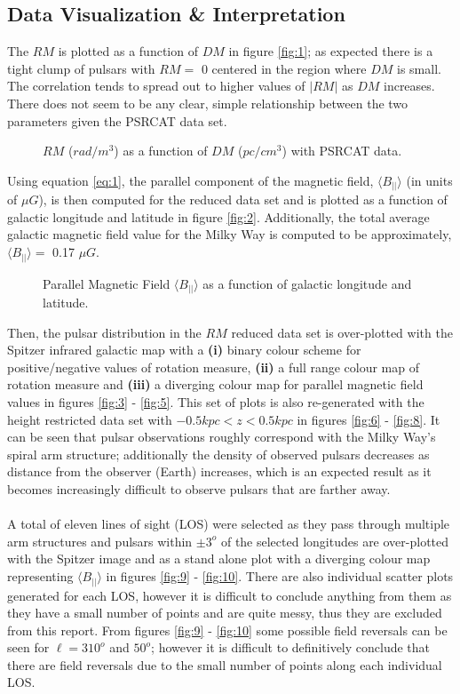 \documentclass[12pt]{article}
\begin{document}
\subsection{Data Visualization \& Interpretation}
    The $RM$ is plotted as a function of $DM$ in figure \eqref{fig:1}; as expected there is a tight clump of pulsars with $RM =$ 0 centered in the region where $DM$ is small. The correlation tends to spread out to higher values of $|RM|$ as $DM$ increases. There does not seem to be any clear, simple relationship between the two parameters given the PSRCAT data set.
    \begin{figure}[!htb]
        \caption{\label{fig:1} $RM$ ($rad/m^{3}$) as a function of $DM$ ($pc/cm^{3}$) with PSRCAT data.}
    \end{figure}
    Using equation \eqref{eq:1}, the parallel component of the magnetic field, $\langle B_{||} \rangle$ (in units of $\mu G$), is then computed for the reduced data set and is plotted as a function of galactic longitude and latitude in figure \eqref{fig:2}. Additionally, the total average galactic magnetic field value for the Milky Way is computed to be approximately, $\langle B_{||} \rangle =$ 0.17 $\mu G$.
    \begin{figure}[!htb]
        \caption{\label{fig:2} Parallel Magnetic Field $\langle B_{||} \rangle$ as a function of galactic longitude and latitude.}
    \end{figure}
    Then, the pulsar distribution in the $RM$ reduced data set is over-plotted with the Spitzer infrared galactic map with a \textbf{(i)} binary colour scheme for positive/negative values of rotation measure, \textbf{(ii)} a full range colour map of rotation measure and \textbf{(iii)} a diverging colour map for parallel magnetic field values in figures \eqref{fig:3} - \eqref{fig:5}. This set of plots is also re-generated with the height restricted data set with $-0.5 kpc < z < 0.5 kpc$ in figures \eqref{fig:6} - \eqref{fig:8}. It can be seen that pulsar observations roughly correspond with the Milky Way's spiral arm structure; additionally the density of observed pulsars decreases as distance from the observer (Earth) increases, which is an expected result as it becomes increasingly difficult to observe pulsars that are farther away.
    \\
    \\
    A total of eleven lines of sight (LOS) were selected as they pass through multiple arm structures and pulsars within $\pm 3^{o}$ of the selected longitudes are over-plotted with the Spitzer image and as a stand alone plot with a diverging colour map representing $\langle B_{||} \rangle$ in figures \eqref{fig:9} - \eqref{fig:10}. There are also individual scatter plots generated for each LOS, however it is difficult to conclude anything from them as they have a small number of points and are quite messy, thus they are excluded from this report. From figures \eqref{fig:9} - \eqref{fig:10} some possible field reversals can be seen for $\ell = 310^{o}$ and $50^{o}$; however it is difficult to definitively conclude that there are field reversals due to the small number of points along each individual LOS.
\end{document}
